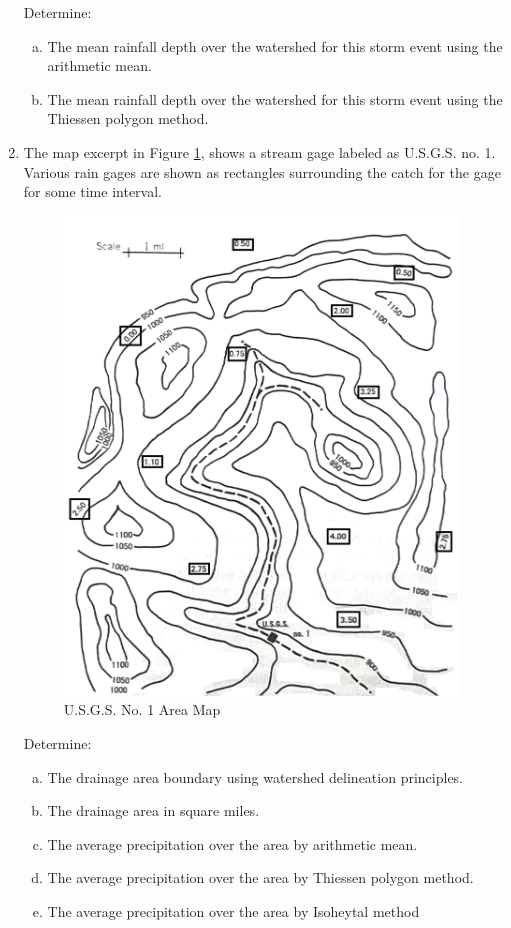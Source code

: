 \documentclass[12pt]{article}
\begin{document}
\begin{enumerate}
\begin{table}[h!]
\begin{tabular}{p{2.0in}p{2.0in}}
\hline
\end{tabular}
\label{tab:gagemap}
\end{table}

Determine:
    \begin{enumerate}[a)]
        \item The mean rainfall depth over the watershed for this storm event using the arithmetic mean. 
        \item The mean rainfall depth over the watershed for this storm event using the Thiessen polygon method. 
    \end{enumerate}


\clearpage
\item The map excerpt in Figure \ref{fig:usgsmap}, shows a stream gage labeled as U.S.G.S. no. 1.  Various rain gages are shown as rectangles surrounding the catch for the gage for some time interval.  

\begin{figure}[h!] %
   \centering
   \includegraphics[height=5in]{Map.jpg} 
   \caption{U.S.G.S. No. 1 Area Map}
   \label{fig:usgsmap}
\end{figure}

Determine:
    \begin{enumerate}[a)]
        \item The drainage area boundary using watershed delineation principles.
        \item The drainage area in square miles. 
        \item The average precipitation over the area by arithmetic mean. 
        \item The average precipitation over the area by Thiessen polygon method. 
        \item The average precipitation over the area by Isoheytal method
    \end{enumerate}



    
\end{enumerate}
\end{document}
